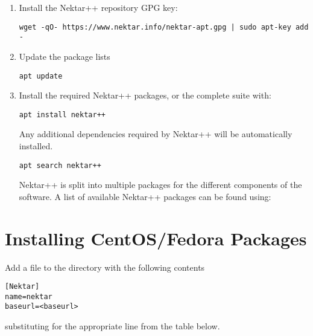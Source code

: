 \begin{enumerate}
    \item Install the Nektar++ repository GPG key:
    \begin{lstlisting}[style=BashInputStyle]
    wget -qO- https://www.nektar.info/nektar-apt.gpg | sudo apt-key add -
    \end{lstlisting}
	\item Update the package lists
	\begin{lstlisting}[style=BashInputStyle]
	apt update
	\end{lstlisting}
	\item Install the required Nektar++ packages, or the complete suite with:
	\begin{lstlisting}[style=BashInputStyle]
	apt install nektar++
	\end{lstlisting}
	Any additional dependencies required by Nektar++ will be automatically installed.
	
    \newsavebox\installationDebTip
    \begin{lrbox}{\installationDebTip}\begin{minipage}{0.8\linewidth}
    \begin{lstlisting}[style=BashInputStyle]
    apt search nektar++
    \end{lstlisting}
    \end{minipage}
    \end{lrbox}
	
	\begin{tipbox}
	Nektar++ is split into multiple packages for the different components of the
	software. A list of available Nektar++ packages can be found using:
	\noindent\usebox\installationDebTip
	\end{tipbox}
\end{enumerate}


\section{Installing CentOS/Fedora Packages}
\label{s:installation:redhat}
Add a file  to the directory  with the following contents
\begin{lstlisting}[style=BashInputStyle]
[Nektar]
name=nektar
baseurl=<baseurl>
\end{lstlisting}
substituting  for the appropriate line from the table below.

